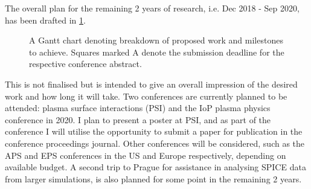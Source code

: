 \documentclass[a4paper, 11pt]{article} %
\begin{document}


	The overall plan for the remaining 2 years of research, i.e. Dec 2018 - Sep 2020, has been drafted in \cref{fig:timeline}.
	\begin{figure}[t]
		\vspace{-0pt}
		\caption{A Gantt chart denoting breakdown of proposed work and milestones to achieve. Squares marked A denote the submission deadline for the respective conference abstract.}
		\label{fig:timeline} 
	\end{figure}
	This is not finalised but is intended to give an overall impression of the desired work and how long it will take. 
	Two conferences are currently planned to be attended: plasma surface interactions (PSI) and the IoP plasma physics conference in 2020.
	I plan to present a poster at PSI, and as part of the conference I will utilise the opportunity to submit a paper for publication in the conference proceedings journal.
	Other conferences will be considered, such as the APS and EPS conferences in the US and Europe respectively, depending on available budget.
	A second trip to Prague for assistance in analysing SPICE data from larger simulations, is also planned for some point in the remaining 2 years. 



\begingroup
{}
\setlength\bibitemsep{3.5pt}
\printbibliography
\endgroup
%
%

\end{document}
